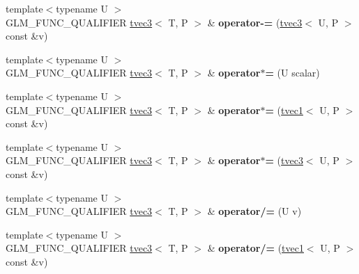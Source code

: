 \begin{DoxyCompactItemize}
\item 
\hypertarget{structglm_1_1tvec3_acec58495abe12a054d93d709f629f3c1}{{\footnotesize template$<$typename U $>$ }\\G\-L\-M\-\_\-\-F\-U\-N\-C\-\_\-\-Q\-U\-A\-L\-I\-F\-I\-E\-R \hyperlink{structglm_1_1tvec3}{tvec3}$<$ T, P $>$ \& {\bfseries operator-\/=} (\hyperlink{structglm_1_1tvec3}{tvec3}$<$ U, P $>$ const \&v)}\label{structglm_1_1tvec3_acec58495abe12a054d93d709f629f3c1}

\item 
\hypertarget{structglm_1_1tvec3_a2821dfbae32c67d80d2cda5e91f9b8f7}{{\footnotesize template$<$typename U $>$ }\\G\-L\-M\-\_\-\-F\-U\-N\-C\-\_\-\-Q\-U\-A\-L\-I\-F\-I\-E\-R \hyperlink{structglm_1_1tvec3}{tvec3}$<$ T, P $>$ \& {\bfseries operator$\ast$=} (U scalar)}\label{structglm_1_1tvec3_a2821dfbae32c67d80d2cda5e91f9b8f7}

\item 
\hypertarget{structglm_1_1tvec3_ad9d8d504912c0ffba2632830103e2b0c}{{\footnotesize template$<$typename U $>$ }\\G\-L\-M\-\_\-\-F\-U\-N\-C\-\_\-\-Q\-U\-A\-L\-I\-F\-I\-E\-R \hyperlink{structglm_1_1tvec3}{tvec3}$<$ T, P $>$ \& {\bfseries operator$\ast$=} (\hyperlink{structglm_1_1tvec1}{tvec1}$<$ U, P $>$ const \&v)}\label{structglm_1_1tvec3_ad9d8d504912c0ffba2632830103e2b0c}

\item 
\hypertarget{structglm_1_1tvec3_ac4c17428380a59febbd0c5f369f90b21}{{\footnotesize template$<$typename U $>$ }\\G\-L\-M\-\_\-\-F\-U\-N\-C\-\_\-\-Q\-U\-A\-L\-I\-F\-I\-E\-R \hyperlink{structglm_1_1tvec3}{tvec3}$<$ T, P $>$ \& {\bfseries operator$\ast$=} (\hyperlink{structglm_1_1tvec3}{tvec3}$<$ U, P $>$ const \&v)}\label{structglm_1_1tvec3_ac4c17428380a59febbd0c5f369f90b21}

\item 
\hypertarget{structglm_1_1tvec3_ada4a543b6b4fcdc9f364ca0a637f3f6d}{{\footnotesize template$<$typename U $>$ }\\G\-L\-M\-\_\-\-F\-U\-N\-C\-\_\-\-Q\-U\-A\-L\-I\-F\-I\-E\-R \hyperlink{structglm_1_1tvec3}{tvec3}$<$ T, P $>$ \& {\bfseries operator/=} (U v)}\label{structglm_1_1tvec3_ada4a543b6b4fcdc9f364ca0a637f3f6d}

\item 
\hypertarget{structglm_1_1tvec3_a8a8b6ba0700dfc397fe1bb232193de1d}{{\footnotesize template$<$typename U $>$ }\\G\-L\-M\-\_\-\-F\-U\-N\-C\-\_\-\-Q\-U\-A\-L\-I\-F\-I\-E\-R \hyperlink{structglm_1_1tvec3}{tvec3}$<$ T, P $>$ \& {\bfseries operator/=} (\hyperlink{structglm_1_1tvec1}{tvec1}$<$ U, P $>$ const \&v)}\label{structglm_1_1tvec3_a8a8b6ba0700dfc397fe1bb232193de1d}


\end{DoxyCompactItemize}
